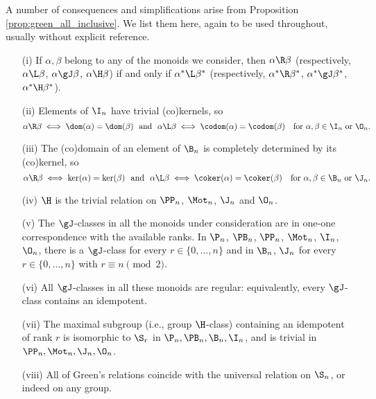 \begin{rem}\label{rem:green_sumbonoids}
A number of consequences and simplifications arise 
from Proposition \ref{prop:green_all_inclusive}.  
We list them here, again to be used throughout, usually without explicit reference.
\begin{itemize} 
\item[(i)]    \label{rem:gs:item1}
If $\alpha,\beta$ belong to any of the monoids we consider, then $\alpha\R\beta$ (respectively, $\alpha\L\beta$, $\alpha\gJ\beta$, $\alpha\H\beta$)
if and only if $\alpha^\ast\L\beta^\ast$ (respectively, $\alpha^\ast\R\beta^\ast$, $\alpha^\ast\gJ\beta^\ast$, $\alpha^\ast\H\beta^\ast$).
\item[(ii)] \label{rem:gs:item2}
Elements of $\I_n$ have trivial (co)kernels, so
\[
\alpha\R\beta \iff \dom(\alpha)=\dom(\beta)\ \  
\text{and}\ \  
\alpha\L\beta \iff \codom(\alpha)=\codom(\beta) 
\ \ \ \text{for} \  \alpha,\beta\in\I_n \text{ or } \O_n.
\]
\item[(iii)] \label{rem:gs:item3}
The (co)domain of an element of $\B_n$ is completely determined by its (co)kernel, so
\[
\alpha\R\beta \iff \ker(\alpha)=\ker(\beta) \ \ 
\text{and}\ \ 
 \alpha\L\beta \iff \coker(\alpha)=\coker(\beta)\ \ \ 
 \text{for}\  \alpha,\beta\in\B_n \  \text{or}\ \J_n.
\]
\item[(iv)] \label{rem:gs:item4}
$\H$ is the trivial relation on $\PP_n$, $\Mot_n$, $\J_n$ and $\O_n$.  
\item[(v)] \label{rem:gs:item5}
The $\gJ$-classes in all the monoids under consideration are in one-one
  correspondence with the available ranks. In $\P_n$, $\PB_n$, $\PP_n$, $\Mot_n$,
  $\I_n$, $\O_n$, there is a $\gJ$-class for every $r\in\{0,\dots,n\}$
  and in $\B_n$, $\J_n$ for every $r\in\{0,\dots,n\}$ with $r\equiv n\pmod{2}$.
\item[(vi)] \label{rem:gs:item6}
All $\gJ$-classes in all these monoids are regular: equivalently, every
  $\gJ$-class contains an idempotent.
\item[(vii)] \label{rem:gs:item7}
The maximal subgroup (i.e., group $\H$-class)  containing an idempotent of rank $r$ is isomorphic to $\S_r$ in
$\P_n,\PB_n,\B_n,\I_n$, and is trivial in $\PP_n,\Mot_n,\J_n, \O_n$.
\item[(viii)] \label{rem:gs:item8}
All of Green's relations coincide with the universal relation on $\S_n$, or indeed on any group.
\end{itemize}
\end{rem}

